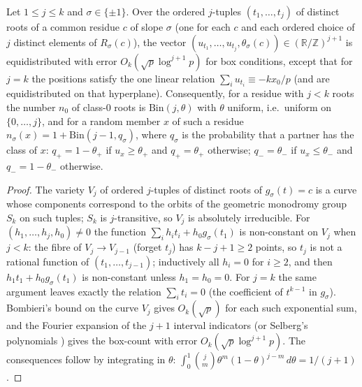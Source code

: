 \begin{lemma}\label{lem:positions}
Let $1\le j\le k$ and $\sigma\in\{\pm1\}$.  Over the ordered $j$-tuples $(t_1,\dots,t_j)$ of distinct roots of a common residue $c$ of slope $\sigma$ (one for each $c$
and each ordered choice of $j$ distinct elements of $R_\sigma(c)$), the vector $(u_{t_1},\dots,u_{t_j},\theta_\sigma(c))\in(\mathbb R/\mathbb Z)^{j+1}$ is equidistributed
with error $O_k(\sqrt p\log^{j+1}p)$ for box conditions, except that for $j=k$ the positions satisfy the one linear relation $\sum_iu_{t_i}\equiv-kx_0/p$
(and are equidistributed on that hyperplane).  Consequently, for a residue with $j<k$ roots the number $n_0$ of class-$0$ roots is $\mathrm{Bin}(j,\theta)$
with $\theta$ uniform, i.e.\ uniform on $\{0,\dots,j\}$, and for a random member $x$ of such a residue $n_\sigma(x)=1+\mathrm{Bin}(j-1,q_\sigma)$, where
$q_\sigma$ is the probability that a partner has the class of $x$: $q_+=1-\theta_+$ if $u_x\ge\theta_+$ and $q_+=\theta_+$ otherwise;
$q_-=\theta_-$ if $u_x\le\theta_-$ and $q_-=1-\theta_-$ otherwise.
\end{lemma}
\begin{proof}
The variety $V_j$ of ordered $j$-tuples of distinct roots of $g_\sigma(t)=c$ is a curve whose components correspond to the orbits of the geometric monodromy
group $S_k$ on such tuples; $S_k$ is $j$-transitive, so $V_j$ is absolutely irreducible.  For $(h_1,\dots,h_j,h_0)\ne0$ the function
$\sum_ih_it_i+h_0g_\sigma(t_1)$ is non-constant on $V_j$ when $j<k$: the fibre of $V_j\to V_{j-1}$ (forget $t_j$) has $k-j+1\ge2$ points, so $t_j$ is not a
rational function of $(t_1,\dots,t_{j-1})$; inductively all $h_i=0$ for $i\ge2$, and then $h_1t_1+h_0g_\sigma(t_1)$ is non-constant unless $h_1=h_0=0$.  For
$j=k$ the same argument leaves exactly the relation $\sum_it_i=0$ (the coefficient of $t^{k-1}$ in $g_\sigma$).  Bombieri's bound on the curve $V_j$
\cite{IK} gives $O_k(\sqrt p)$ for each such exponential sum, and the Fourier expansion of the $j+1$ interval indicators (or Selberg's polynomials
\cite{Montgomery,Vaaler}) gives the box-count with error $O_k(\sqrt p\log^{j+1}p)$.  The consequences follow by integrating in $\theta$:
$\int_0^1\binom j m\theta^m(1-\theta)^{j-m}\,d\theta=1/(j+1)$.
\end{proof}

